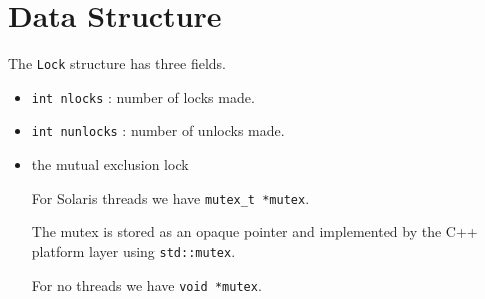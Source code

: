 \par
\section{Data Structure}
\label{section:Lock:dataStructure}
\par
The {\tt Lock} structure has three fields.
\begin{itemize}
\item {\tt int nlocks} : number of locks made.
\item {\tt int nunlocks} : number of unlocks made.
\item the mutual exclusion lock
\par
For Solaris threads we have {\tt mutex\_t *mutex}.
\par
The mutex is stored as an opaque pointer and implemented by the C++
platform layer using {\tt std::mutex}.
\par
For no threads we have {\tt void *mutex}.
\end{itemize}
